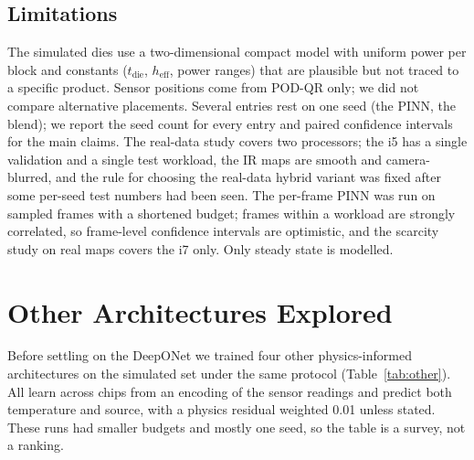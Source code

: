 \documentclass[journal]{IEEEtran}
\begin{document}
\subsection{Limitations}
The simulated dies use a two-dimensional compact model with uniform power per block and constants ($t_\mathrm{die}$, $h_\mathrm{eff}$, power ranges) that are plausible but not traced to a specific product.
Sensor positions come from POD-QR only; we did not compare alternative placements.
Several entries rest on one seed (the PINN, the blend); we report the seed count for every entry and paired confidence intervals for the main claims.
The real-data study covers two processors; the i5 has a single validation and a single test workload, the IR maps are smooth and camera-blurred, and the rule for choosing the real-data hybrid variant was fixed after some per-seed test numbers had been seen.
The per-frame PINN was run on sampled frames with a shortened budget; frames within a workload are strongly correlated, so frame-level confidence intervals are optimistic, and the scarcity study on real maps covers the i7 only.
Only steady state is modelled.

\section{Other Architectures Explored}\label{sec:other}

Before settling on the DeepONet we trained four other physics-informed architectures on the simulated set under the same protocol (Table~\ref{tab:other}).
All learn across chips from an encoding of the sensor readings and predict both temperature and source, with a physics residual weighted 0.01 unless stated.
These runs had smaller budgets and mostly one seed, so the table is a survey, not a ranking.
\end{document}
